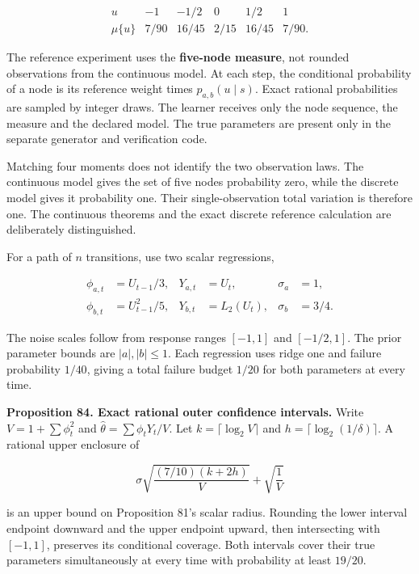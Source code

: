 \documentclass[11pt,letterpaper]{article}
\begin{document}
\[
\begin{array}{c|rrrrr}
u&-1&-1/2&0&1/2&1\\\hline
\mu\{u\}&7/90&16/45&2/15&16/45&7/90.
\end{array}
\]

The reference experiment uses the \textbf{five-node measure}, not
rounded observations from the continuous model. At each step, the
conditional probability of a node is its reference weight times
\(p_{a,b}(u\mid s)\). Exact rational probabilities are sampled by
integer draws. The learner receives only the node sequence, the measure
and the declared model. The true parameters are present only in the
separate generator and verification code.

Matching four moments does not identify the two observation laws. The
continuous model gives the set of five nodes probability zero, while the
discrete model gives it probability one. Their single-observation total
variation is therefore one. The continuous theorems and the exact
discrete reference calculation are deliberately distinguished.

For a path of \(n\) transitions, use two scalar regressions,

\[
\begin{aligned}
\phi_{a,t}&=U_{t-1}/3,&Y_{a,t}&=U_t,&\sigma_a&=1,\\
\phi_{b,t}&=U_{t-1}^2/5,&Y_{b,t}&=L_2(U_t),&\sigma_b&=3/4.
\end{aligned}
\]

The noise scales follow from response ranges \([-1,1]\) and
\([-1/2,1]\). The prior parameter bounds are \(|a|,|b|\leq1\). Each
regression uses ridge one and failure probability \(1/40\), giving a
total failure budget \(1/20\) for both parameters at every time.

\textbf{Proposition 84. Exact rational outer confidence intervals.}
Write \(V=1+\sum\phi_t^2\) and \(\widehat\theta=\sum\phi_tY_t/V\). Let
\(k=\lceil\log_2 V\rceil\) and \(h=\lceil\log_2(1/\delta)\rceil\). A
rational upper enclosure of

\[
\sigma\sqrt{\frac{(7/10)(k+2h)}{V}}+\sqrt{\frac1V}
\]

is an upper bound on Proposition 81's scalar radius. Rounding the lower
interval endpoint downward and the upper endpoint upward, then
intersecting with \([-1,1]\), preserves its conditional coverage. Both
intervals cover their true parameters simultaneously at every time with
probability at least \(19/20\).
\end{document}
